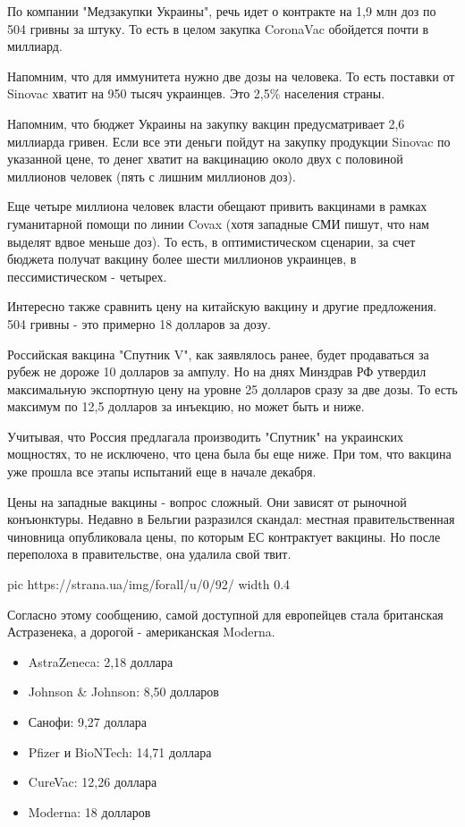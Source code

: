По компании "Медзакупки Украины", речь идет о контракте на 1,9 млн доз по 504
гривны за штуку. То есть в целом закупка CoronaVac обойдется почти в миллиард.

Напомним, что для иммунитета нужно две дозы на человека. То есть поставки от
Sinovac хватит на 950 тысяч украинцев. Это 2,5\% населения страны. 

Напомним, что бюджет Украины на закупку вакцин предусматривает 2,6 миллиарда
гривен. Если все эти деньги пойдут на закупку продукции Sinovac по указанной
цене, то денег хватит на вакцинацию около двух с половиной миллионов человек
(пять с лишним миллионов доз). 

Еще четыре миллиона человек власти обещают привить вакцинами в рамках
гуманитарной помощи по линии Covax (хотя западные СМИ пишут, что нам выделят
вдвое меньше доз). То есть, в оптимистическом сценарии, за счет бюджета получат
вакцину более шести миллионов украинцев, в пессимистическом - четырех.

Интересно также сравнить цену на китайскую вакцину и другие предложения. 504
гривны - это примерно 18 долларов за дозу.

Российская вакцина "Спутник V", как заявлялось ранее, будет продаваться за
рубеж не дороже 10 долларов за ампулу. Но на днях Минздрав РФ утвердил
максимальную экспортную цену на уровне 25 долларов сразу за две дозы. То есть
максимум по 12,5 долларов за инъекцию, но может быть и ниже. 

Учитывая, что Россия предлагала производить "Спутник" на украинских мощностях,
то не исключено, что цена была бы еще ниже. При том, что вакцина уже прошла все
этапы испытаний еще в начале декабря. 

Цены на западные вакцины - вопрос сложный. Они зависят от рыночной конъюнктуры.
Недавно в Бельгии разразился скандал: местная правительственная чиновница
опубликовала цены, по которым ЕС контрактует вакцины. Но после переполоха в
правительстве, она удалила свой твит.

\ifcmt
  pic https://strana.ua/img/forall/u/0/92/%
  width 0.4
\fi

Согласно этому сообщению, самой доступной для европейцев стала британская
Астразенека, а дорогой - американская Moderna.

\begin{itemize}
\item AstraZeneca: 2,18 доллара 
\item Johnson \& Johnson: 8,50 долларов
\item Санофи: 9,27 доллара 
\item Pfizer и BioNTech: 14,71 доллара 
\item CureVac: 12,26 доллара 
\item Moderna: 18 долларов
\end{itemize}

